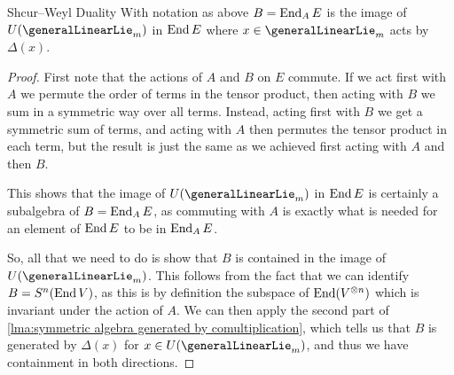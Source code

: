 \begin{prp}{Shcur--Weyl Duality}{}
    With notation as above \(B = \operatorname{End}_A E\) is the image of \(U(\generalLinearLie_m)\) in \(\operatorname{End} E\) where \(x \in \generalLinearLie_m\) acts by \(\Delta(x)\).
    \begin{proof}
        First note that the actions of \(A\) and \(B\) on \(E\) commute.
        If we act first with \(A\) we permute the order of terms in the tensor product, then acting with \(B\) we sum in a symmetric way over all terms.
        Instead, acting first with \(B\) we get a symmetric sum of terms, and acting with \(A\) then permutes the tensor product in each term, but the result is just the same as we achieved first acting with \(A\) and then \(B\).
        
        This shows that the image of \(U(\generalLinearLie_m)\) in \(\operatorname{End} E\) is certainly a subalgebra of \(B = \operatorname{End}_A E\), as commuting with \(A\) is exactly what is needed for an element of \(\operatorname{End} E\) to be in \(\operatorname{End}_A E\).
        
        So, all that we need to do is show that \(B\) is contained in the image of \(U(\generalLinearLie_m)\).
        This follows from the fact that we can identify \(B = S^n(\operatorname{End} V)\), as this is by definition the subspace of \(\operatorname{End} (V^{\otimes n})\) which is invariant under the action of \(A\).
        We can then apply the second part of \cref{lma:symmetric algebra generated by comultiplication}, which tells us that \(B\) is generated by \(\Delta(x)\) for \(x \in U(\generalLinearLie_m)\), and thus we have containment in both directions.
    \end{proof}
\end{prp}

